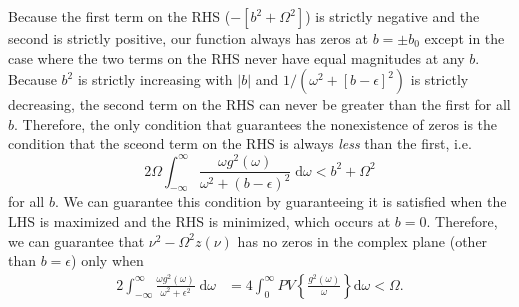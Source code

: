 \begin{itemize}
{\begin{equation}
    \end{equation}
    Because the first term on the RHS ($-[b^2 + \Omega^2]$) is strictly negative and the second is strictly positive, our function always has zeros at $b = \pm b_0$ except in the case where the two terms on the RHS never have equal magnitudes at any $b$. Because $b^2$ is strictly increasing with $|b|$ and $1/(\omega^2 + [b - \epsilon]^2)$ is strictly decreasing, the second term on the RHS can never be greater than the first for all $b$. Therefore, the only condition that guarantees the nonexistence of zeros is the condition that the sceond term on the RHS is always \textit{less} than the first, i.e.
    \begin{equation}
    2\Omega\int_{-\infty}^\infty\frac{\omega g^2(\omega)}{\omega^2 + (b - \epsilon)^2}\;\mathrm{d}\omega < b^2 + \Omega^2
    \end{equation}
    for all $b$. We can guarantee this condition by guaranteeing it is satisfied when the LHS is maximized and the RHS is minimized, which occurs at $b = 0$. Therefore, we can guarantee that $\nu^2 - \Omega^2z(\nu)$ has no zeros in the complex plane (other than $b = \epsilon$) only when 
    \begin{equation}\label{eq:consistencyCondition1}
    \begin{split}
    2\int_{-\infty}^\infty \frac{\omega g^2(\omega)}{\omega^2 + \epsilon^2}\;\mathrm{d}\omega &= 4\int_0^\infty PV\left\{\frac{g^2(\omega)}{\omega}\right\}\mathrm{d}\omega < \Omega.
    \end{split}
    \end{equation}
    }
\end{itemize}

